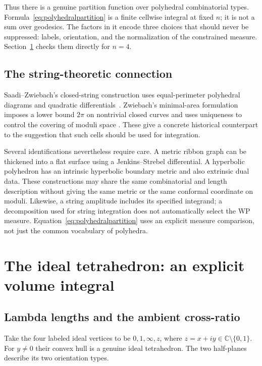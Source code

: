 \documentclass[11pt,a4paper]{article}
\numberwithin{equation}{section}
\theoremstyle{definition}
\theoremstyle{remark}
\newcommand{\CC}{\mathbb C}
\begin{document}
Thus there is a genuine partition function over polyhedral combinatorial
types. Formula~\eqref{eq:polyhedralpartition} is a finite cellwise integral
at fixed $n$; it is not a sum over geodesics. The factors in it encode three
choices that should never be suppressed: labels, orientation, and the
normalization of the constrained measure. Section~\ref{sec:tetrahedron}
checks them directly for $n=4$.

\subsection{The string-theoretic connection}

Saadi--Zwiebach's closed-string construction uses equal-perimeter polyhedral
diagrams and quadratic differentials~\cite{SaadiZwiebach}. Zwiebach's
minimal-area formulation imposes a lower bound $2\pi$ on nontrivial closed
curves and uses uniqueness to control the covering of moduli space
\cite{Zwiebach}. These give a concrete historical counterpart to the
suggestion that such cells should be used for integration.

Several identifications nevertheless require care. A metric ribbon graph
can be thickened into a flat surface using a Jenkins--Strebel differential.
A hyperbolic polyhedron has an intrinsic hyperbolic boundary metric and also
extrinsic dual data. These constructions may share the same combinatorial
and length description without giving the same metric or the same conformal
coordinate on moduli. Likewise, a string amplitude includes its specified
integrand; a decomposition used for string integration does not automatically
select the WP measure. Equation~\eqref{eq:polyhedralpartition} uses an
explicit measure comparison, not just the common vocabulary of polyhedra.

\section{The ideal tetrahedron: an explicit volume integral}
\label{sec:tetrahedron}

\subsection{Lambda lengths and the ambient cross-ratio}

Take the four labeled ideal vertices to be $0,1,\infty,z$, where
$z=x+iy\in\CC\setminus\{0,1\}$. For $y\ne0$ their convex hull is a genuine
ideal tetrahedron. The two half-planes describe its two orientation types.
\end{document}
